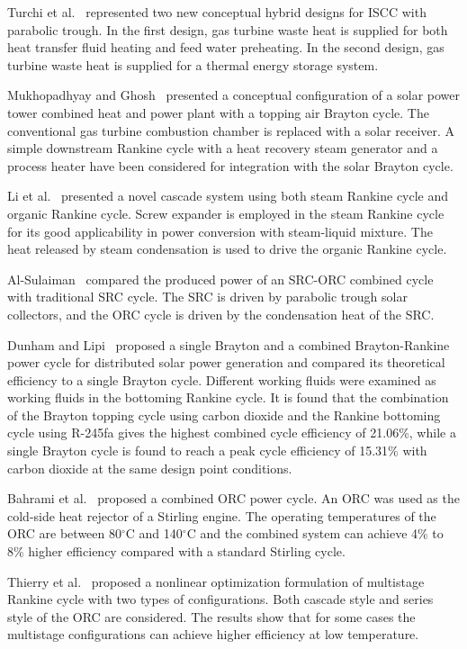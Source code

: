 Turchi et al.~\cite{Turchi2014} represented two new conceptual hybrid designs for ISCC with parabolic trough. In the first design, gas turbine waste heat is supplied for both heat transfer fluid heating and feed water preheating. In the second design, gas turbine waste heat is supplied for a thermal energy storage system.

Mukhopadhyay and Ghosh~\cite{Mukhopadhyay2016} presented a conceptual configuration of a solar power tower combined heat and power plant with a topping air Brayton cycle. The conventional gas turbine combustion chamber is replaced with a solar receiver. A simple downstream Rankine cycle with a heat recovery steam generator and a process heater have been considered for integration with the solar Brayton cycle.

Li et al.~\cite{Li2016a} presented a novel cascade system using both steam Rankine cycle and organic Rankine cycle. Screw expander is employed in the steam Rankine cycle for its good applicability in power conversion with steam-liquid mixture. The heat released by steam condensation is used to drive the organic Rankine cycle.

Al-Sulaiman~\cite{AlSulaiman2014} compared the produced power of an SRC-ORC combined cycle with traditional SRC cycle. The SRC is driven by parabolic trough solar collectors, and the ORC cycle is driven by the condensation heat of the SRC.

Dunham and Lipi~\cite{Dunham2013} proposed a single Brayton and a combined Brayton-Rankine power cycle for distributed solar power generation and compared its theoretical efficiency to a single Brayton cycle. Different working fluids were examined as working fluids in the bottoming Rankine cycle. It is found that the combination of the Brayton topping cycle using carbon dioxide and the Rankine bottoming cycle using R-245fa gives the highest combined cycle efficiency of 21.06\%, while a single Brayton cycle is found to reach a peak cycle efficiency of 15.31\% with carbon dioxide at the same design point conditions. 

Bahrami et al.~\cite{Bahrami2013} proposed a combined ORC power cycle. An ORC was used as the cold-side heat rejector of a Stirling engine. The operating temperatures of the ORC are between 80$\mathrm{^\circ C}$ and 140$\mathrm{^\circ C}$ and the combined system can achieve 4\% to 8\% higher efficiency compared with a standard Stirling cycle.

Thierry et al.~\cite{Thierry2016} proposed a nonlinear optimization formulation of multistage Rankine cycle with two types of configurations. Both cascade style and series style of the ORC are considered. The results show that for some cases the multistage configurations can achieve higher efficiency at low temperature.

